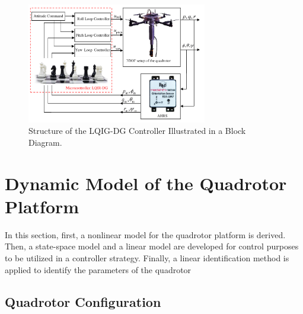 \documentclass[3p,times]{elsarticle}
\begin{document}
\begin{figure}[H]
   \centering
   \includegraphics[width=0.7\textwidth]{../Figure/schematic.pdf}
   \caption{Structure of the LQIG-DG Controller Illustrated in a Block Diagram.}
   \label{fig:blockdiagram}
\end{figure}



\section{Dynamic Model of the Quadrotor Platform}\label{sec:modeling}
In this section, first, a nonlinear model for the quadrotor platform is derived. Then, a state-space model and a linear model are developed for control purposes to be utilized in a controller strategy. Finally, a linear identification method is applied to identify the parameters of the quadrotor
\subsection{Quadrotor Configuration}
\end{document}
